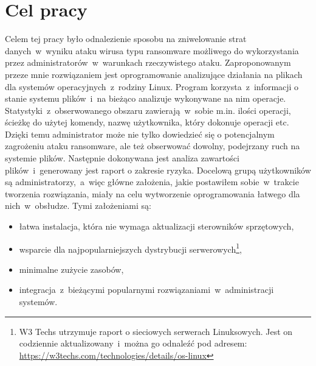 \section{Cel pracy}
Celem tej pracy było odnalezienie sposobu na zniwelowanie strat danych~w~wyniku ataku wirusa typu ransomware możliwego do wykorzystania przez administratorów~w~warunkach rzeczywistego ataku. Zaproponowanym przeze mnie rozwiązaniem jest oprogramowanie analizujące działania na plikach dla systemów operacyjnych~z~rodziny Linux.
 Program korzysta~z~informacji o stanie systemu plików~i~na bieżąco analizuje wykonywane na nim operacje. Statystyki~z~obserwowanego obszaru zawierają~w~sobie m.in. ilości operacji, ścieżkę do użytej komendy, nazwę użytkownika, który dokonuje operacji etc. Dzięki temu administrator może nie tylko dowiedzieć się o potencjalnym zagrożeniu ataku ransomware, ale też obserwować dowolny, podejrzany ruch na systemie plików. Następnie dokonywana jest analiza zawartości plików~i~generowany jest raport o zakresie ryzyka.
Docelową grupą użytkowników są administratorzy,~a~więc główne założenia, jakie postawiłem sobie~w~trakcie tworzenia rozwiązania, miały na celu wytworzenie oprogramowania łatwego dla nich~w~obsłudze. Tymi założeniami są:
\begin{itemize}
    \item łatwa instalacja, która nie wymaga aktualizacji sterowników sprzętowych,
    \item wsparcie dla najpopularniejszych dystrybucji serwerowych\footnote{W3 Techs utrzymuje raport o sieciowych serwerach Linuksowych. Jest on codziennie aktualizowany~i~można go odnaleźć pod adresem: \url{https://w3techs.com/technologies/details/os-linux}},
    \item minimalne zużycie zasobów,
    \item integracja~z~bieżącymi popularnymi rozwiązaniami~w~administracji systemów.
\end{itemize}

